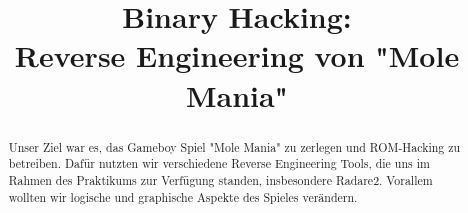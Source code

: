 \documentclass[conference,dvipsnames]{IEEEtran}
\begin{document}
\title{Binary Hacking:\\Reverse Engineering von "Mole Mania"}

\author{
}

\maketitle

\begin{abstract}
	Unser Ziel war es, das Gameboy Spiel "Mole Mania" zu zerlegen und ROM-Hacking zu betreiben.
  Dafür nutzten wir verschiedene Reverse Engineering Tools, die uns im Rahmen des Praktikums 
  zur Verfügung standen, insbesondere Radare2. Vorallem wollten wir logische und 
  graphische Aspekte des Spieles verändern.
\end{abstract}










\clearpage
%
\end{document}
